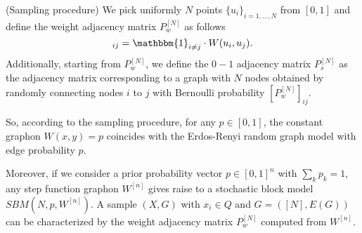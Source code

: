 \begin{definition}(Sampling procedure)
	We pick uniformly $N$ points $\{u_i\}_{i=1,\ldots,N}$ from $[0,1]$ and define the weight adjacency matrix $P_w^{[N]}$ as follows
	\begin{equation}
	[P_w^{[N]}]_{ij} = \mathbbm{1}_{i \neq j} \cdot W(u_i, u_j).
	\end{equation}
	Additionally, starting from $P_w^{[N]}$, we define the $0-1$ adjacency matrix $P_s^{[N]}$ as the adjacency matrix corresponding to a graph with $N$ nodes obtained by randomly connecting nodes $i$ to $j$ with Bernoulli probability $[P_{w}^{[N]}]_{ij}$.
\end{definition}

So, according to the sampling procedure, for any $p \in [0,1]$, the constant graphon $W(x,y) = p$ coincides with the Erdos-Renyi random graph model with edge probability $p$. 

Moreover, if we consider a prior probability vector $p \in [0,1]^n$ with $\sum_{k} p_k = 1$, any step function graphon $W^{[n]}$ gives raise to a stochastic block model $SBM(N, p, W^{[n]})$. A sample $(X,G)$ with $x_i \in Q$ and $G=([N],E(G))$ can be characterized by the weight adjacency matrix $P_{w}^{[N]}$ computed from $W^{[n]}$.



